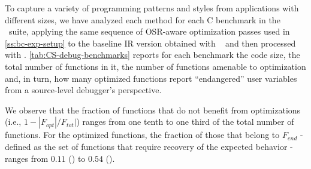 To capture a variety of programming patterns and styles from applications with different sizes, we have analyzed each method for each C benchmark in the \speccpu\ suite, applying the same sequence of OSR-aware optimization passes used in \mysection\ref{ss:bc-exp-setup} to the baseline IR version obtained with \clang\  and then processed with \memtoreg. \mytable\ref{tab:CS-debug-benchmarks} reports for each benchmark the code size, the total number of functions in it, the number of functions amenable to optimization and, in turn, how many optimized functions report ``endangered'' user variables from a source-level debugger's perspective.

We observe that the fraction of functions that do not benefit from optimizations (i.e., $1-|F_{opt}|/F_{tot}|$) ranges from one tenth to one third of the total number of functions. For the optimized functions, the fraction of those that belong to $F_{end}$ - defined as the set of functions that require recovery of the expected behavior - ranges from $0.11$ () to $0.54$ ().

